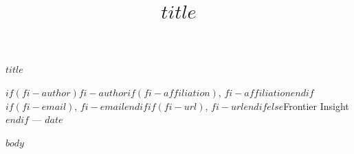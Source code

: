 \documentclass[10pt,a4paper]{article}
\title{\Large\bfseries $title$}
\author{}
\date{}
\newcounter{none}
\begin{document}
{\Large\bfseries $title$ \par}
\vspace{0.4em}
{\small $if(fi-author)$$fi-author$$if(fi-affiliation)$, $fi-affiliation$$endif$$if(fi-email)$, $fi-email$$endif$$if(fi-url)$, $fi-url$$endif$$else$Frontier Insight$endif$ — $date$ \par}
\vspace{1.2em}

$body$
\end{document}
